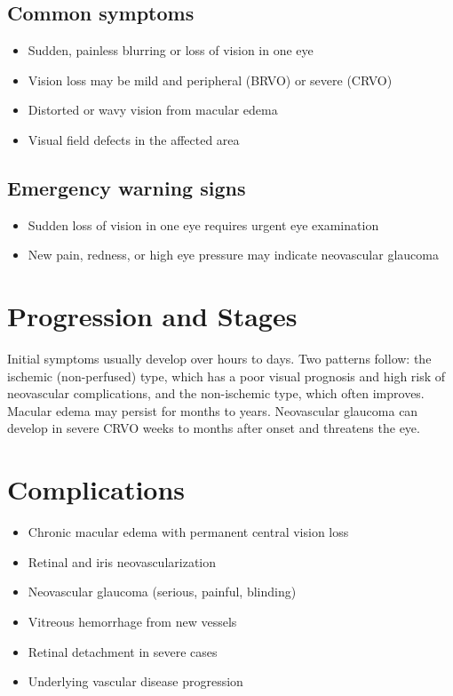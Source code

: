 \subsection{Common symptoms}
\begin{itemize}[noitemsep]
  \item Sudden, painless blurring or loss of vision in one eye
  \item Vision loss may be mild and peripheral (BRVO) or severe (CRVO)
  \item Distorted or wavy vision from macular edema
  \item Visual field defects in the affected area
\end{itemize}
\subsection{Emergency warning signs}
\begin{itemize}[noitemsep]
  \item Sudden loss of vision in one eye requires urgent eye examination
  \item New pain, redness, or high eye pressure may indicate neovascular glaucoma
\end{itemize}
\section{Progression and Stages}
Initial symptoms usually develop over hours to days. Two patterns follow: the ischemic (non-perfused) type, which has a poor visual prognosis and high risk of neovascular complications, and the non-ischemic type, which often improves. Macular edema may persist for months to years. Neovascular glaucoma can develop in severe CRVO weeks to months after onset and threatens the eye.
\section{Complications}
\begin{itemize}[noitemsep]
  \item Chronic macular edema with permanent central vision loss
  \item Retinal and iris neovascularization
  \item Neovascular glaucoma (serious, painful, blinding)
  \item Vitreous hemorrhage from new vessels
  \item Retinal detachment in severe cases
  \item Underlying vascular disease progression
\end{itemize}
